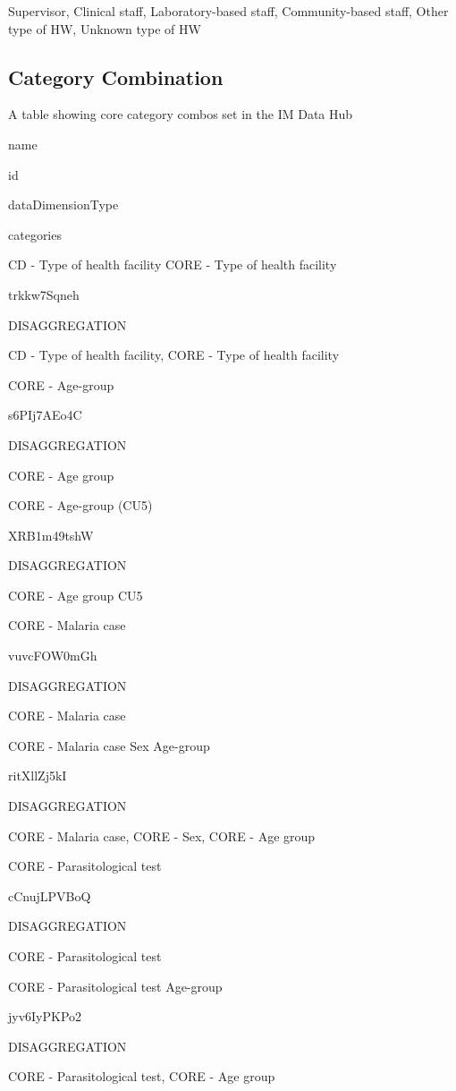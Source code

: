 \documentclass[]{book}
\begin{document}
Supervisor, Clinical staff, Laboratory-based staff, Community-based staff, Other type of HW, Unknown type of HW

\hypertarget{category-combination}{%
\subsection{Category Combination}\label{category-combination}}

\label{tab:unnamed-chunk-16}A table showing core category combos set in the IM Data Hub

name

id

dataDimensionType

categories

CD - Type of health facility \textbar{} CORE - Type of health facility

trkkw7Sqneh

DISAGGREGATION

CD - Type of health facility, CORE - Type of health facility

CORE - Age-group

s6PIj7AEo4C

DISAGGREGATION

CORE - Age group

CORE - Age-group (CU5)

XRB1m49tshW

DISAGGREGATION

CORE - Age group CU5

CORE - Malaria case

vuvcFOW0mGh

DISAGGREGATION

CORE - Malaria case

CORE - Malaria case \textbar{} Sex \textbar{} Age-group

ritXllZj5kI

DISAGGREGATION

CORE - Malaria case, CORE - Sex, CORE - Age group

CORE - Parasitological test

cCnujLPVBoQ

DISAGGREGATION

CORE - Parasitological test

CORE - Parasitological test \textbar{} Age-group

jyv6IyPKPo2

DISAGGREGATION

CORE - Parasitological test, CORE - Age group
\end{document}
